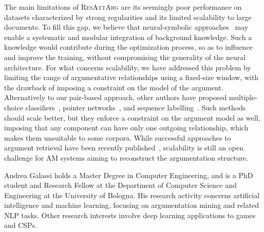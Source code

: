 \documentclass[journal]{IEEEtran}
\begin{document}
The main limitations of \textsc{ResAttArg} are its seemingly poor performance on datasets characterized by strong regularities and its limited scalability to large documents.
To fill this gap, we believe that neural-symbolic approaches~\cite{DBLP:journals/fdata/GalassiK0ST19} may enable a systematic and modular integration of background knowledge. Such a knowledge would contribute during the optimization process, so as to influence and improve the training, without compromising the generality of the neural architecture.
For what concerns scalability, we have addressed this problem by limiting the range of argumentative relationships using a fixed-size window, with the drawback of imposing a constraint on the model of the argument.
Alternatively to our pair-based approach, other authors have proposed multiple-choice classifiers~\cite{DBLP:conf/ecai/0002CV20}, pointer networks~\cite{potash2017here}, and sequence labelling~\cite{eger2017neural}. Such methods should scale better, but they enforce a constraint on the argument model as well, imposing that any component can have only one outgoing relationship, which makes them unsuitable to some corpora.
While successful approaches to argument retrieval have been recently published~\cite{corpus-wide-am}, scalability is still an open challenge for AM systems aiming to reconstruct the argumentation structure.
 








































\begin{IEEEbiography}
{Andrea Galassi} holds a Master Degree in Computer Engineering, and is a PhD student and Research Fellow at the Department of Computer Science and Engineering at the University of Bologna. His research activity concerns artificial intelligence and machine learning, focusing on argumentation mining and related NLP tasks. Other research interests involve deep learning applications to games and CSPs.
\end{IEEEbiography}
\end{document}
